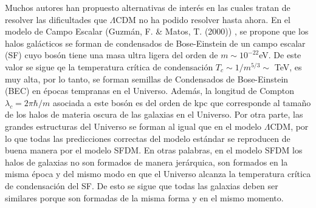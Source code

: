 \documentclass[a4paper,openright,12pt]{book}
\begin{document}
Muchos autores han propuesto alternativas de interés en las cuales tratan de resolver las dificultades que $\Lambda$CDM no ha podido resolver hasta ahora. En el modelo de Campo Escalar (Guzmán, F. \& Matos, T. (2000)) \cite{Siddhartha Matos}, se propone que los halos galácticos se forman de condensados de Bose-Einstein de un campo escalar (SF) cuyo bosón tiene una masa ultra ligera del orden de $m \sim 10^{-22}$eV. De este valor se sigue qe la temperatura crítica de condensación $T_{c} \sim 1/m^{5/3} \sim $ TeV, es muy alta, por lo tanto, se forman semillas de Condensados de Bose-Einstein (BEC) en épocas tempranas en el Universo. Además, la longitud de Compton $\lambda_{c} = 2\pi \hbar / m$ asociada a este bosón es del orden de kpc que corresponde al tamaño de los halos de materia oscura de las galaxias en el Universo. Por otra parte, las grandes estructuras del Universo se forman al igual que en el modelo $\Lambda$CDM, por lo que todas las predicciones correctas del modelo estándar se reproducen de buena manera por el modelo SFDM. En otras palabras, en el modelo SFDM los halos de galaxias no son formados de manera jerárquica, son formados en  la misma época y del mismo modo en que el Universo alcanza la temperatura crítica de condensación del SF. De esto se sigue que todas las galaxias deben ser similares porque son formadas de la misma forma y en el mismo momento.  
\end{document}
